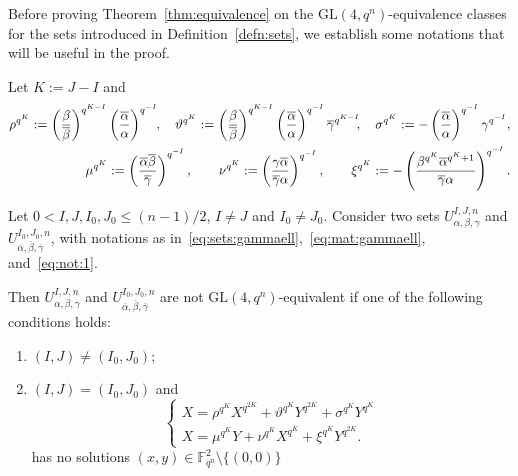 Before proving Theorem~\ref{thm:equivalence} on the $\textrm{GL}(4,q^n)$-equivalence classes for the sets introduced in Definition~\ref{defn:sets}, we establish some notations that will be useful in the proof.

Let $K:= J - I$ and
{\small \begin{eqnarray}
  \rho^{q^K}:= \left(\frac{\beta}{\overline{\beta}}\right)^{q^{K-I}}\left(\frac{\overline{\alpha}}{\alpha}\right)^{q^{-I}}\hspace{-0.1cm}, \quad \vartheta^{q^K}:= \left(\frac{\beta}{\overline{\beta}}\right)^{q^{K-I}}\left(\frac{\overline{\alpha}}{\alpha}\right)^{q^{-I}}\overline{\gamma}^{q^{K-I}}\hspace{-0.1cm}, \quad \sigma^{q^K}:= - \left(\frac{\overline{\alpha}}{\alpha}\right)^{q^{-I}}\gamma^{q^{-I}},\nonumber\\
 \mu^{q^K}:= \left(\frac{\overline{\alpha}\overline{\beta}}{\overline{\gamma}}\right)^{q^{-I}} , \qquad \nu^{q^K}:= \left(\frac{\gamma \overline{\alpha}}{\overline{\gamma}\alpha}\right)^{q^{-I}} , \qquad \xi^{q^K}:= - \left(\frac{\beta^{q^K}\overline{\alpha}^{q^K+1}}{\overline{\gamma}\alpha}\right)^{q^{-I}}.\label{eq:not:1}
\end{eqnarray}}

\begin{theorem}
\label{thm:equivalence}
Let $0< I,J,I_0,J_0\leq (n-1)/2$, $I\neq J$ and $I_0\neq J_0$. 
Consider two sets $U_{\alpha, \beta, \gamma}^{I,J,n}$ and $U_{\overline{\alpha}, \overline{\beta}, \overline{\gamma}}^{I_0,J_0,n}$, with notations as in~\eqref{eq:sets:gammaell},~\eqref{eq:mat:gammaell}, and~\eqref{eq:not:1}.

Then $U_{\alpha, \beta, \gamma}^{I,J,n}$ and $U_{\overline{\alpha}, \overline{\beta}, \overline{\gamma}}^{I_0,J_0,n}$ are not $\textrm{GL}(4,q^n)$-equivalent if one of the following conditions holds:
\begin{enumerate}
    \item $(I,J)\neq (I_0, J_0)$;
    \item $(I,J)= (I_0, J_0)$ and 
    $$
    \begin{cases}
    X = \rho^{q^K}X^{q^{2K}} + \vartheta^{q^K}Y^{q^{2K}} + \sigma^{q^K}Y^{q^K}\\
    X = \mu^{q^K}Y + \nu^{q^K}X^{q^K} + \xi^{q^K}Y^{q^{2K}}.
    \end{cases}
    $$
    has no solutions $(x,y)\in \mathbb{F}_{q^n}^2\setminus\{(0,0)\}$
\end{enumerate}
\end{theorem}


